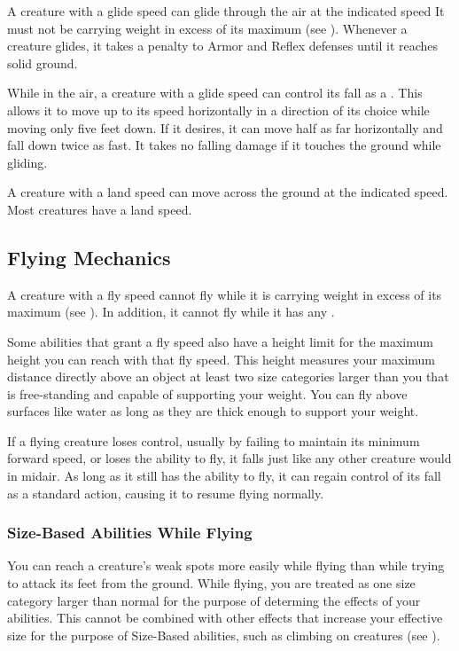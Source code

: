         \label{Gliding}
        A creature with a glide speed can glide through the air at the indicated speed
        It must not be carrying weight in excess of its maximum  (see ).
        Whenever a creature glides, it takes a  penalty to Armor and Reflex defenses until it reaches solid ground.

        While in the air, a creature with a glide speed can control its fall as a . This allows it to move up to its speed horizontally in a direction of its choice while moving only five feet down. If it desires, it can move half as far horizontally and fall down twice as fast. It takes no falling damage if it touches the ground while gliding.

        A creature with a land speed can move across the ground at the indicated speed.
        Most creatures have a land speed.

    \subsection{Flying Mechanics}\label{Flying Mechanics}
        A creature with a fly speed cannot fly while it is carrying weight in excess of its maximum  (see ).
        In addition, it cannot fly while it has any .

         Some abilities that grant a fly speed also have a height limit for the maximum height you can reach with that fly speed.
        This height measures your maximum distance directly above an object at least two size categories larger than you that is free-standing and capable of supporting your weight.
        You can fly above surfaces like water as long as they are thick enough to support your weight.

         If a flying creature loses control, usually by failing to maintain its minimum forward speed, or loses the ability to fly, it falls just like any other creature would in midair. As long as it still has the ability to fly, it can regain control of its fall as a standard action, causing it to resume flying normally.

        \subsubsection{Size-Based Abilities While Flying}
            You can reach a creature's weak spots more easily while flying than while trying to attack its feet from the ground.
            While flying, you are treated as one size category larger than normal for the purpose of determing the effects of your  abilities.
            This cannot be combined with other effects that increase your effective size for the purpose of Size-Based abilities, such as climbing on creatures (see ).

